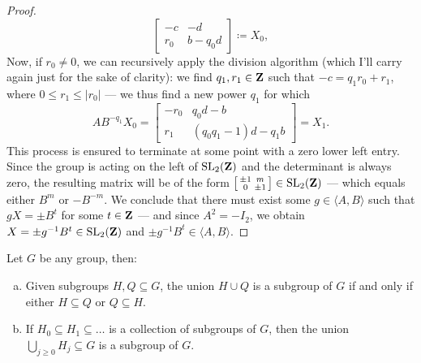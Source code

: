 \begin{proof}
\[\begin{bmatrix}
            - c & - d \\ r_0  & b - q_0 d
        \end{bmatrix} \coloneq X_0,
    \]
    Now, if \(r_0 \neq 0\), we can recursively apply the division algorithm (which
    I'll carry again just for the sake of clarity): we find \(q_1, r_1 \in \mathbf{Z}\) such
    that \(-c = q_1 r_0 + r_1\), where \(0 \leq r_1 \leq |r_0|\) --- we thus find a
    new power \(q_1\) for which
    \[
        A B^{-q_1} X_0 =
        \begin{bmatrix}
            -r_0 & q_0 d - b               \\
            r_1  & (q_0 q_1 - 1) d - q_1 b
        \end{bmatrix}
        = X_1.
    \]
    This process is ensured to terminate at some point with a zero lower left
    entry. Since the group is acting on the left of \(\operatorname{SL}_2(\mathbf{Z})\) and the
    determinant is always zero, the resulting matrix will be of the form
    \(\big[
        \begin{smallmatrix}
            \pm 1 & m \\ 0 & \pm 1
        \end{smallmatrix}\big] \in \operatorname{SL}_2(\mathbf{Z})\) --- which equals either \(B^m\) or
    \(-B^{-m}\). We conclude that there must exist some \(g \in \langle A, B
    \rangle\) such that \(g X = \pm B^t\) for some \(t \in \mathbf{Z}\) --- and since \(A^2
    = - I_2\), we obtain \(X = \pm g^{-1} B^t \in \operatorname{SL}_2(\mathbf{Z})\) and \(\pm g^{-1} B^t
    \in \langle A, B \rangle\).
\end{proof}

\begin{proposition}
    \label{prop:union-of-subgroups}
    Let \(G\) be any group, then:
    \begin{enumerate}[(a)]\setlength\itemsep{0em}
        \item Given subgroups \(H, Q \subseteq G\), the union \(H \cup Q\) is a subgroup
              of \(G\) if and only if either \(H \subseteq Q\) or \(Q \subseteq H\).

        \item If \(H_0 \subseteq H_1 \subseteq \dots\) is a collection of subgroups of
              \(G\), then the union \(\bigcup_{j \geq 0} H_j \subseteq G\) is a subgroup of
              \(G\).
    \end{enumerate}
\end{proposition}

